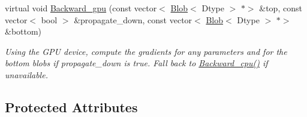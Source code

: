 \begin{DoxyCompactItemize}
virtual void \mbox{\hyperlink{classcaffe_1_1_scale_layer_aa0a2e96ec16cc61a2d8a9d47b729bee4}{Backward\+\_\+gpu}} (const vector$<$ \mbox{\hyperlink{classcaffe_1_1_blob}{Blob}}$<$ Dtype $>$ $\ast$$>$ \&top, const vector$<$ bool $>$ \&propagate\+\_\+down, const vector$<$ \mbox{\hyperlink{classcaffe_1_1_blob}{Blob}}$<$ Dtype $>$ $\ast$$>$ \&bottom)
\begin{DoxyCompactList}\small\item\em Using the G\+PU device, compute the gradients for any parameters and for the bottom blobs if propagate\+\_\+down is true. Fall back to \mbox{\hyperlink{classcaffe_1_1_scale_layer_a4b41188afeb445da06721fdf80526cf0}{Backward\+\_\+cpu()}} if unavailable. \end{DoxyCompactList}\end{DoxyCompactItemize}
\subsection*{Protected Attributes}
